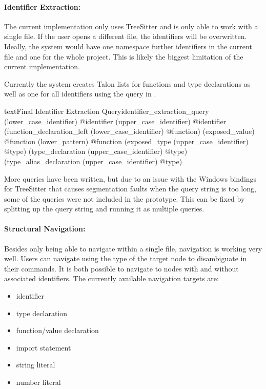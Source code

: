 \documentclass[../thesis.tex]{subfiles}
\begin{document}
\paragraph{Identifier Extraction:}
The current implementation only uses TreeSitter and is only able to work with a single file.
If the user opens a different file, the identifiers will be overwritten.
Ideally, the system would have one namespace further identifiers in the current file
and one for the whole project.
This is likely the biggest limitation of the current implementation.

Currently the system creates Talon lists for functions and type declarations as well as one for all identifiers using the query in .
\begin{code}{text}{Final Identifier Extraction Query}{identifier_extraction_query}
(lower_case_identifier) @identifier 
(upper_case_identifier) @identifier
(function_declaration_left (lower_case_identifier) @function)
(exposed_value) @function
(lower_pattern) @function
(exposed_type (upper_case_identifier) @type)
(type_declaration (upper_case_identifier) @type)
(type_alias_declaration (upper_case_identifier) @type)
\end{code}
More queries have been written, but due to an issue with the Windows bindings for TreeSitter
that causes segmentation faults when the query string is too long, some of the queries
were not included in the prototype.
This can be fixed by splitting up the query string and running it as multiple queries.

\paragraph{Structural Navigation:}
Besides only being able to navigate within a single file, navigation is working very well.
Users can navigate using the type of the target node to disambiguate in their commands.
It is both possible to navigate to nodes with and without associated identifiers.
The currently available navigation targets are:
\begin{itemize}
    \item identifier
    \item type declaration
    \item function/value declaration
    \item import statement
    \item string literal
    \item number literal
\end{itemize}
\end{document}
